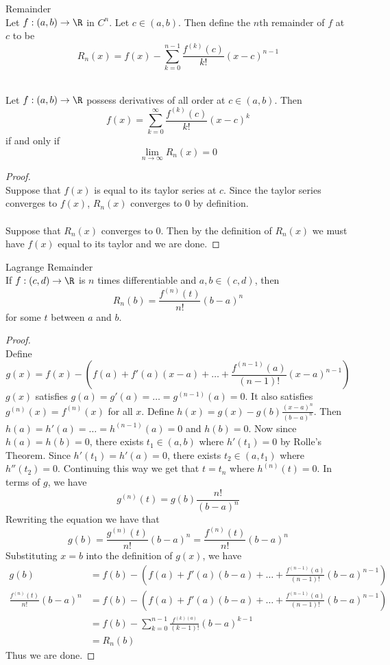 \documentclass[a4paper]{article}
\begin{document}
\begin{defn}{Remainder}{}\\ Let $f:(a,b)\to\R$ in $C^n$. Let $c\in(a,b)$. Then define the $n$th remainder of $f$ at $c$ to be $$R_n(x)=f(x)-\sum_{k=0}^{n-1}\frac{f^{(k)}(c)}{k!}(x-c)^{n-1}$$
\end{defn}

\begin{thm}{}{}\\ Let $f:(a,b)\to\R$ possess derivatives of all order at $c\in(a,b)$. Then $$f(x)=\sum_{k=0}^{\infty}\frac{f^{(k)}(c)}{k!}(x-c)^k$$ if and only if $$\lim_{n\to\infty}R_n(x)=0$$ 
\begin{proof}\\
Suppose that $f(x)$ is equal to its taylor series at $c$. Since the taylor series converges to $f(x)$, $R_n(x)$ converges to $0$ by definition. \\~\\
Suppose that $R_n(x)$ converges to $0$. Then by the definition of $R_n(x)$ we must have $f(x)$ equal to its taylor and we are done. 
\end{proof}
\end{thm}

\begin{thm}{Lagrange Remainder}{}\\ If $f:(c,d)\to\R$ is $n$ times differentiable and $a,b\in(c,d)$, then $$R_n(b)=\frac{f^{(n)}(t)}{n!}(b-a)^n$$ for some $t$ between $a$ and $b$. 
\begin{proof}\\ Define $$g(x)=f(x)-\left(f(a)+f'(a)(x-a)+\dots+\frac{f^{(n-1)}(a)}{(n-1)!}(x-a)^{n-1}\right)$$ $g(x)$ satisfies $g(a)=g'(a)=\dots=g^{(n-1)}(a)=0$. It also satisfies $g^{(n)}(x)=f^{(n)}(x)$ for all $x$. Define $h(x)=g(x)-g(b)\frac{(x-a)^n}{(b-a)^n}$. Then $h(a)=h'(a)=\dots=h^{(n-1)}(a)=0$ and $h(b)=0$. Now since $h(a)=h(b)=0$, there exists $t_1\in(a,b)$ where $h'(t_1)=0$ by Rolle's Theorem. Since $h'(t_1)=h'(a)=0$, there exists $t_2\in(a,t_1)$ where $h''(t_2)=0$. Continuing this way we get that $t=t_n$ where $h^{(n)}(t)=0$. In terms of $g$, we have $$g^{(n)}(t)=g(b)\frac{n!}{(b-a)^n}$$ Rewriting the equation we have that $$g(b)=\frac{g^{(n)}(t)}{n!}(b-a)^n=\frac{f^{(n)}(t)}{n!}(b-a)^n$$ Substituting $x=b$ into the definition of $g(x)$, we have 
\begin{align*}
g(b)&=f(b)-\left(f(a)+f'(a)(b-a)+\dots+\frac{f^{(n-1)}(a)}{(n-1)!}(b-a)^{n-1}\right)\\
\frac{f^{(n)}(t)}{n!}(b-a)^n&=f(b)-\left(f(a)+f'(a)(b-a)+\dots+\frac{f^{(n-1)}(a)}{(n-1)!}(b-a)^{n-1}\right)\\
&=f(b)-\sum_{k=0}^{n-1}\frac{f^{(k)(a)}}{(k-1)!}(b-a)^{k-1}\\
&=R_n(b)
\end{align*}
Thus we are done. 
\end{proof}
\end{thm}
\end{document}
